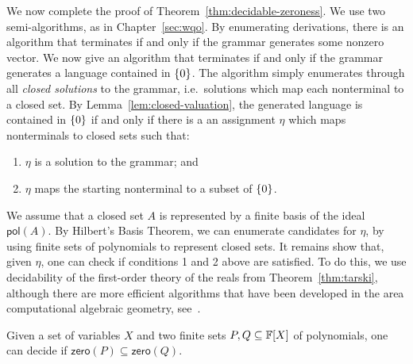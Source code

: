 	
We now complete the proof of Theorem~\ref{thm:decidable-zeroness}. We use two semi-algorithms, as in Chapter~\ref{sec:wqo}.  By enumerating derivations, there is  an algorithm that terminates if and only if the grammar generates some nonzero vector. We now give an algorithm that terminates if and only if the grammar generates a language contained in $\{0\}$. The algorithm simply enumerates through all  \emph{closed solutions} to the grammar, i.e.~solutions which map each nonterminal to a closed set. By Lemma~\ref{lem:closed-valuation}, the generated language is contained in $\{0\}$ if and only if there is a an assignment $\eta$ which maps nonterminals to closed sets such that:
\begin{enumerate}
\item $\eta$ is a solution to the grammar; and 
	\item  $\eta$ maps the starting nonterminal to a subset of $\{0\}$.
\end{enumerate}
	We assume  that a closed set $A$ is represented by a finite basis of the ideal $\mathsf{pol}(A)$.
  By Hilbert's Basis Theorem, we can enumerate candidates for $\eta$, by using finite sets of polynomials to represent closed sets. It remains show that, given $\eta$, one can check if conditions 1 and 2 above are satisfied. To do this, we use decidability of the first-order theory of the reals from Theorem~\ref{thm:tarski}, although there are more efficient algorithms that have been developed in the area computational algebraic geometry, see~\cite[Theorem 11]{Bigatti:2017cm}.
  \begin{lemma}
Given a set of variables $X$ and two finite   sets $P, Q \subseteq \mathbb F[X]$ of polynomials, one can decide if $\mathsf{zero}(P) \subseteq \mathsf{zero}(Q)$. 
\end{lemma}
